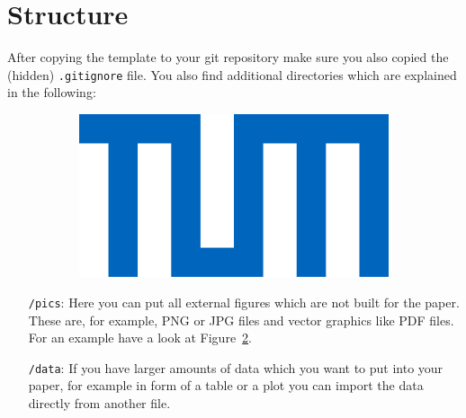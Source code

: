 \section{Structure}
After copying the template to your git repository make sure you also
copied the (hidden) \texttt{.gitignore} file.
You also find additional directories which are explained in the following:

\begin{figure}
		\centering
	\begin{subfigure}[c]{0.45\textwidth}
				\centering
		\includegraphics[width=.4\textwidth]{pics/example}
		\label{fig:external_pdf}	
	\end{subfigure}
\end{figure}


\begin{itemize}
	\item[\texttt{/pics}:] Here you can put all external figures which are
	not built for the paper. These are, for example, PNG or JPG files and
	vector graphics like PDF files. For an example have a look at
	Figure~\ref{fig:external_pdf}.
	
	\item[\texttt{/data}:] If you have larger amounts of data which you
	want to put into your paper, for example in form of a table or a plot
	you can import the data directly from another file.
\end{itemize}

